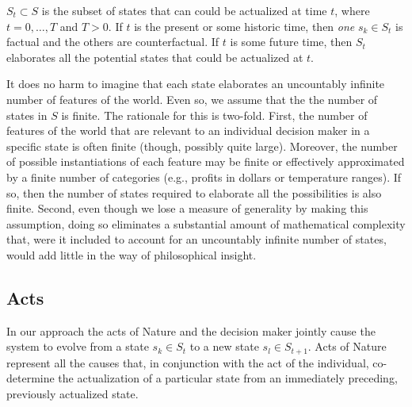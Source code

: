\documentclass[
11pt,
titlepage,
reqno,
]{article}%
\theoremstyle{definition}
\begin{document}
$S_t\subset S$ is the subset of states  that can could be actualized at time $t$, where $t=0,\ldots,T$ and $T>0$.
If $t$ is the present or some historic time, then \textit{one}  $s_k\in S_t$ is factual and the others are counterfactual. 
If $t$ is some future time, then $S_t$ elaborates all the potential states that could be actualized at $t$.

It does no harm to imagine that each state elaborates an uncountably infinite number of features of the world.
Even so,  we assume that the the number of states in $S$ is finite.
The rationale for this is two-fold.
First, the number of features of the world that are relevant to an individual decision maker in a specific state is often finite (though, possibly quite large).
Moreover, the number of possible instantiations of each feature may be finite or effectively approximated by a finite number of  categories (e.g., profits in dollars or temperature ranges).
If so, then the number of states required to elaborate all the possibilities is also finite.
Second, even  though we lose a measure of generality by making this assumption, doing so eliminates a substantial amount of mathematical complexity that, were it included to account for an uncountably infinite number of states, would add little in the way of philosophical insight.
	
	
	
\subsection{Acts}\label{sec:acts}
	
In our approach the acts of Nature and the decision maker jointly cause the system to evolve from a state $s_k\in S_t$ to a new state $s_l\in S_{t+1}$.
Acts of Nature represent all the causes that, in conjunction with the act of the individual, co-determine the actualization of a particular state from an immediately preceding, previously actualized state.
	
\end{document}
